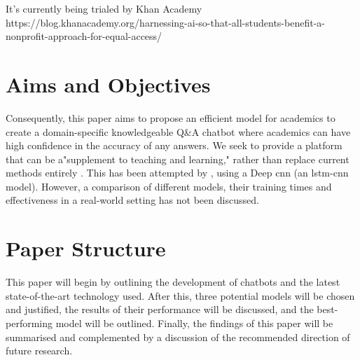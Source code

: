 It's currently being trialed by Khan Academy https://blog.khanacademy.org/harnessing-ai-so-that-all-students-benefit-a-nonprofit-approach-for-equal-access/

\section{Aims and Objectives} %
\label{sec:intro_aims_and_objectives}

Consequently, this paper aims to propose an efficient model for academics to create a domain-specific knowledgeable Q\&A chatbot where academics can have high confidence in the accuracy of any answers. We seek to provide a platform that can be a"supplement to teaching and learning," rather than replace current methods entirely \citep{Nee2023ExploringTT}. This has been attempted by \citep{Chen22}, using a Deep \acrlong{cnn} (an \acrshort{lstm}-\acrshort{cnn} model). However, a comparison of different models, their training times and effectiveness in a real-world setting has not been discussed.


\section{Paper Structure}
\label{sec:intro_paper_structure}

This paper will begin by outlining the development of chatbots and the latest state-of-the-art technology used. After this, three potential models will be chosen and justified, the results of their performance will be discussed, and the best-performing model will be outlined. Finally, the findings of this paper will be summarised and complemented by a discussion of the recommended direction of future research. %
